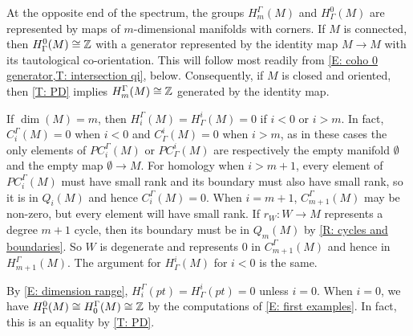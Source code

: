 \begin{example}
	At the opposite end of the spectrum, the groups $H_m^\Gamma(M)$ and $H^0_\Gamma(M)$ are represented by maps of $m$-dimensional manifolds with corners.
	If $M$ is connected, then $H^0_\Gamma(M) \cong \mathbb{Z}$ with a generator represented by the identity map $M \to M$ with its tautological co-orientation.
	This will follow most readily from \cref{E: coho 0 generator,T: intersection qi}, below.
	Consequently, if $M$ is closed and oriented, then \cref{T: PD} implies $H_m^\Gamma(M) \cong \mathbb{Z}$ generated by the identity map.
\end{example}

\begin{example}\label{E: dimension range}
	If $\dim(M) = m$, then $H_i^\Gamma(M) = H^i_\Gamma(M) = 0$ if $i < 0$ or $i > m$.
	In fact, $C_i^\Gamma(M) = 0$ when $i<0$ and $C^i_\Gamma(M) = 0$ when $i > m$, as in these cases the only elements of $PC_i^\Gamma(M)$ or $PC^i_\Gamma(M)$ are respectively the empty manifold $\emptyset$ and the empty map $\emptyset \to M$.
	For homology when $i>m+1$, every element of $PC_i^\Gamma(M)$ must have small rank and its boundary must also have small rank, so it is in $Q_i(M)$ and hence $C_i^\Gamma(M) = 0$.
	When $i = m+1$, $C_{m+1}^\Gamma(M)$ may be non-zero, but every element will have small rank.
	If $r_W \colon W \to M$ represents a degree $m+1$ cycle, then its boundary must be in $Q_m(M)$ by \cref{R: cycles and boundaries}.
	So $W$ is degenerate and represents $0$ in $C_{m+1}^\Gamma(M)$ and hence in $H_{m+1}^\Gamma(M)$.
	The argument for $H^i_\Gamma(M)$ for $i<0$ is the same.
\end{example}



\begin{example}\label{E: dimension}
	By \cref{E: dimension range}, $H_i^\Gamma(pt) = H^i_\Gamma(pt) = 0$ unless $i = 0$.
	When $i = 0$, we have $H^0_\Gamma(M) \cong H_0^\Gamma(M) \cong \mathbb{Z}$ by the computations of \cref{E: first examples}.
	In fact, this is an equality by \cref{T: PD}.
\end{example}

